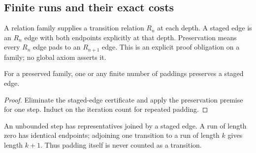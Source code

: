 
\subsection{Finite runs and their exact costs}



\begin{definition}
A relation family supplies a transition relation $R_n$ at each depth. A staged edge is an $R_n$ edge with both endpoints explicitly at that depth. Preservation means every $R_n$ edge pads to an $R_{n+1}$ edge. This is an explicit proof obligation on a family; no global axiom asserts it.
\end{definition}





\begin{lemma}
For a preserved family, one or any finite number of paddings preserves a staged edge.
\end{lemma}

\begin{proof}
Eliminate the staged-edge certificate and apply the preservation premise for one step. Induct on the iteration count for repeated padding.
\end{proof}





\begin{definition}
An unbounded step has representatives joined by a staged edge. A run of length zero has identical endpoints; adjoining one transition to a run of length $k$ gives length $k+1$. Thus padding itself is never counted as a transition.
\end{definition}


